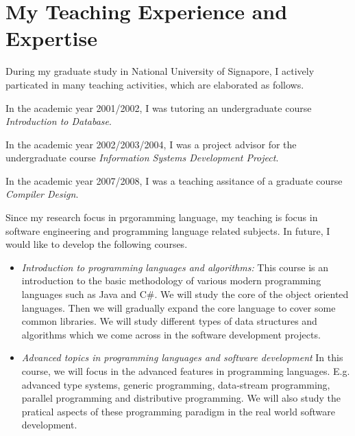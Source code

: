 \documentclass[12pt]{article}
\theoremstyle{plain} \numberwithin{equation}{section}
\theoremstyle{definition}
\begin{document}
\section{My Teaching Experience and Expertise}
During my graduate study in National University of Signapore,
I actively particated in many teaching activities, which are elaborated as follows.

In the academic year 2001/2002, I was tutoring 
an undergraduate course {\em Introduction to Database}. 

In the academic year 2002/2003/2004, I was a project advisor for the undergraduate course
{\em Information Systems Development Project}.

In the academic year 2007/2008, I was a teaching assitance of a graduate course
{\em Compiler Design}.

Since my research focus in prgoramming language, my teaching is focus in 
software engineering and programming language related subjects.
In future, I would like to develop the following courses.

\begin{itemize}
 \item {\em Introduction to programming languages and algorithms:} 
This course is an introduction to the basic methodology of various modern programming 
languages such as Java and C\#. We will study the core of the object oriented 
languages. Then we will gradually expand the core language to cover 
some common libraries. We will study different types of data structures and algorithms
which we come across in the software development projects.
 \item {\em Advanced topics in programming languages and software development}
In this course, we will focus in the advanced features in programming languages.
E.g. advanced type systems, generic programming, data-stream programming,
parallel programming and distributive programming. We will also study 
the pratical aspects of these programming paradigm in the real world software development.
\end{itemize}
\end{document}

